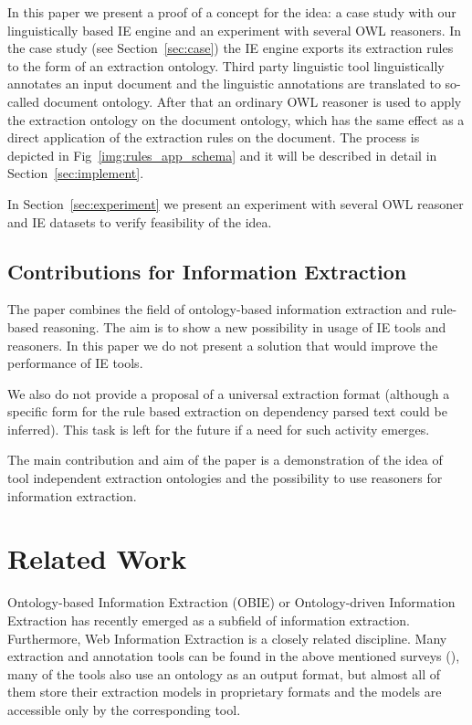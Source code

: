 In this paper we present a proof of a concept for the idea: a case study with our linguistically based IE engine and an experiment with several OWL reasoners. In the case study (see Section~\ref{sec:case}) the IE engine exports its extraction rules to the form of an extraction ontology. Third party linguistic tool linguistically annotates an input document and the linguistic annotations are translated to so-called document ontology. After that an ordinary OWL reasoner is used to apply the extraction ontology on the document ontology, which has the same effect as a direct application of the extraction rules on the document. The process is depicted in Fig~\ref{img:rules_app_schema} and it will be described in detail in Section~\ref{sec:implement}.


In Section~\ref{sec:experiment} we present an experiment with several OWL reasoner and IE datasets to verify feasibility of the idea.  


\subsection{Contributions for Information Extraction}
The paper combines the field of ontology-based information extraction and rule-based reasoning. The aim is to show a new possibility in usage of IE tools and reasoners. In this paper we do not present a solution that would improve the performance of IE tools.

We also do not provide a proposal of a universal extraction format (although a specific form for the rule based extraction on dependency parsed text could be inferred). This task is left for the future if a need for such activity emerges.

The main contribution and aim of the paper is a demonstration of the idea of tool independent extraction ontologies and the possibility to use reasoners for information extraction.


\section{Related Work}
Ontology-based Information Extraction (OBIE) \citep{citeulike:7291004} or Ontology-driven Information Extraction \citep{Yildiz:2007:OMO:1793154.1793216} has recently emerged as a subfield of information extraction. Furthermore, Web Information Extraction \citep{DBLP:journals/tkde/ChangKGS06} is a closely related discipline. Many extraction and annotation tools can be found in the above mentioned surveys (\citep{citeulike:7291004,DBLP:journals/tkde/ChangKGS06}), many of the tools also use an ontology as an output format, but almost all of them store their extraction models in proprietary formats and the models are accessible only by the corresponding tool.


